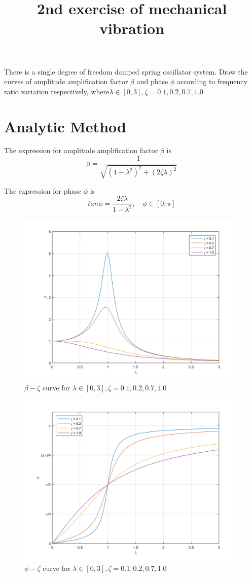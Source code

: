 \documentclass[12pt,a4paper]{article}
\title{\bf 2nd exercise of mechanical vibration}
\begin{document}
\maketitle
There is a single degree of freedom damped spring oscillator system. Draw the curves of amplitude amplification factor $\beta$ and phase $\phi$ according to frequency ratio variation respectively, where$\lambda  \in [0,3],\zeta  = 0.1,0.2,0.7,1.0$  

\section{Analytic Method}
The expression for amplitude amplification factor $\beta$ is
\begin{equation}
\beta = \frac{1}{\sqrt{(1 - \lambda^2)^2+(2\zeta \lambda)^2}}
\end{equation}

The expression for phase $\phi$ is
\begin{equation}
tan \phi = \frac{2\zeta\lambda}{1-\lambda^2},\quad  \phi \in [0,\pi]
\end{equation}


\begin{figure}[h!]
\centering
\includegraphics[width=0.7\linewidth]{source/bata_image}
\caption{$\beta{-}\zeta$ curve for $\lambda \in [0,3],\zeta = 0.1,0.2,0.7,1.0$}
\end{figure}

\begin{figure}[!h]
\centering
\includegraphics[width=0.7\linewidth]{source/phi_image}
\caption{$\phi{-}\zeta$ curve for $\lambda  \in [0,3],\zeta  = 0.1,0.2,0.7,1.0$}
\end{figure}
\end{document}
